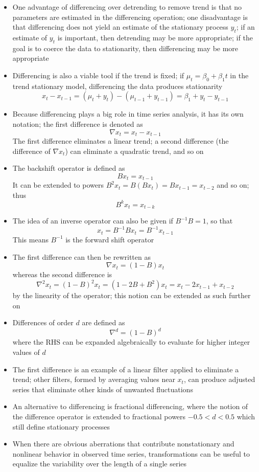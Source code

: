 \documentclass[12pt]{article}
\begin{document}
\begin{itemize}
\item One advantage of differencing over detrending to remove trend is that no parameters are estimated in the differencing operation; one disadvantage is that differencing does not yield an estimate of the stationary process $y_t$; if an estimate of $y_t$ is important, then detrending may be more appropriate; if the goal is to coerce the data to stationarity, then differencing may be more appropriate 
\item Differencing is also a viable tool if the trend is fixed; if $\mu_t = \beta_0 + \beta_1t$ in the trend stationary model, differencing the data produces stationarity 
$$x_t - x_{t-1} = (\mu_t + y_t) - (\mu_{t-1} + y_{t-1}) = \beta_1 + y_t - y_{t-1} $$ 
\item Because differencing plays a big role in time series analysis, it has its own notation; the first difference is denoted as $$ \nabla x_t = x_t - x_{t-1} $$ The first difference eliminates a linear trend; a second difference (the difference of $\nabla x_t$) can eliminate a quadratic trend, and so on
\item The backshift operator is defined as $$ Bx_t = x_{t-1} $$ It can be extended to powers $B^2x_t = B(Bx_t) = Bx_{t-1} = x_{t-2}$ and so on; thus $$ B^kx_t = x_{t-k}$$ 
\item The idea of an inverse operator can also be given if $B^{-1}B = 1$, so that $$ x_t = B^{-1}Bx_t = B^{-1}x_{t-1} $$ This means $B^{-1}$ is the forward shift operator 
\item The first difference can then be rewritten as $$\nabla x_t = (1-B)x_t$$ whereas the second difference is $$ \nabla^2 x_t = (1-B)^2x_t = (1-2B+B^2)x_t = x_t - 2x_{t-1} + x_{t-2} $$ by the linearity of the operator; this notion can be extended as such further on
\item Differences of order $d$ are defined as $$ \nabla^d = (1-B)^d $$ where the RHS can be expanded algebraically to evaluate for higher integer values of $d$ 
\item The first difference is an example of a linear filter applied to eliminate a trend; other filters, formed by averaging values near $x_t$, can produce adjusted series that eliminate other kinds of unwanted fluctuations 
\item An alternative to differencing is fractional differencing, where the notion of the difference operator is extended to fractional powers $-0.5 < d < 0.5$ which still define stationary processes 
\item When there are obvious aberrations that contribute nonstationary and nonlinear behavior in observed time series, transformations can be useful to equalize the variability over the length of a single series

\end{itemize}
\end{document}
